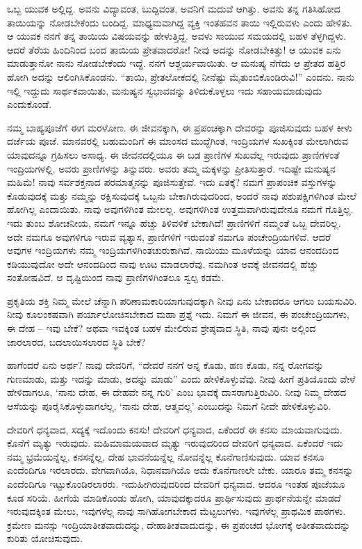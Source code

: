 ಒಬ್ಬ ಯುವಕ ಅಲ್ಲಿದ್ದ. ಅವನು ವಿದ್ಯಾವಂತ, ಬುದ್ದಿವಂತ, ಅವನಿಗೆ ಮದುವೆ ಆಗಿತ್ತು. ಅವನು ತನ್ನ ಗತಿಸಿಹೋದ ತಾಯಿಯನ್ನು ನೋಡಬೇಕೆಂದು ಬಂದಿದ್ದ. ಮಾಧ್ಯಮವಾಗಿದ್ದ ವ್ಯಕ್ತಿ ಇಂತಹವನ ತಾಯಿ ಇಲ್ಲಿರುವಳು ಎಂದು ಹೇಳಿತು. ಆ ಯುವಕ ನನಗೆ ತನ್ನ ತಾಯಿಯ ವಿಷಯವನ್ನು ಹೇಳುತ್ತಿದ್ದ. ಅವಳು ಸಾಯುವ ಸಮಯದಲ್ಲಿ ಬಹಳ ತೆಳ್ಳಗಿದ್ದಳು. ಆದರೆ ತೆರೆಯ ಹಿಂದಿನಿಂದ ಬಂದ ತಾಯಿಯ ಪ್ರೇತವಾದರೋ! ನೀವು ಅದನ್ನು ನೋಡಬೇಕಿತ್ತು! ಆ ಯುವಕ ಏನು ಮಾಡುತ್ತಾನೋ ನಾನು ನೋಡಬೇಕೆಂದು ಇದ್ದೆ. ನನಗೆ ಆಶ್ಚರ್ಯವಾಯಿತು. ಆ ಮನುಷ್ಯ ನೆಗೆದು ಆ ಪ್ರೇತದ ಹತ್ತಿರ ಹೋಗಿ ಅದನ್ನು ಆಲಿಂಗಿಸಿಕೊಂಡನು. “ತಾಯಿ, ಪ್ರೇತಲೋಕದಲ್ಲಿ ನೀನೆಷ್ಟು ಮೈತುಂಬಿಕೊಂಡಿರುವಿ!” ಎಂದನು. ನಾನು ಇಲ್ಲಿ ಇದ್ದುದು ಸಾರ್ಥಕವಾಯಿತು, ಮನುಷ್ಯನ ಸ್ವಭಾವವನ್ನು ತಿಳಿದುಕೊಳ್ಳಲು ಇದು ಸಹಾಯಮಾಡುವುದು ಎಂದುಕೊಂಡೆ.

ನಮ್ಮ ಬಾಹ್ಯಪೂಜೆಗೆ ಈಗ ಮರಳೋಣ. ಈ ಜೀವನಕ್ಕಾಗಿ, ಈ ಪ್ರಪಂಚಕ್ಕಾಗಿ ದೇವರನ್ನು ಪೂಜಿಸುವುದು ಬಹಳ ಕೀಳು ದರ್ಜೆಯ ಪೂಜೆ. ಮಾನವರಲ್ಲಿ ಬಹುಮಂದಿಗೆ ಈ ಮಾಂಸದ ಮುದ್ದೆಗಿಂತ, ಇಂದ್ರಿಯಗಳ ಸುಖಕ್ಕಿಂತ ಮೇಲಾಗಿರುವ ಯಾವುದನ್ನೂ ಗ್ರಹಿಸಲು ಅಸಾಧ್ಯ. ಈ ಜೀವನದಲ್ಲಿಯೂ ಈ ಬಡ ಪ್ರಾಣಿಗಳ ಸುಖವೆಲ್ಲ ಇರುವುದು ಪ್ರಾಣಿಗಳಂತೆ ಇಂದ್ರಿಯಗಳಲ್ಲಿ. ಅವರು ಪ್ರಾಣಿಗಳನ್ನು ತಿನ್ನುವರು. ಅವರು ತಮ್ಮ ಮಕ್ಕಳನ್ನು ಪ್ರೀತಿಸುತ್ತಾರೆ. ಇದಿಷ್ಟೇ ಮನುಷ್ಯನ ಮಹಿಮೆ! ನಾವು ಸರ್ವಶಕ್ತನಾದ ಪರಮಾತ್ಮನನ್ನು ಪೂಜಿಸುತ್ತೇವೆ. ಇದು ಏತಕ್ಕೆ? ನಮಗೆ ಪ್ರಾಪಂಚಿಕ ವಸ್ತುಗಳನ್ನು ಕೊಡುವುದಕ್ಕೆ ಮತ್ತು ನಮ್ಮನ್ನು ರಕ್ಷಿಸುವುದಕ್ಕೆ ಒಬ್ಬನು ಬೇಕಾಗಿರುವುದರಿಂದ, ಅಂದರೆ ನಾವು ಪಶುಪಕ್ಷಿಗಳಿಗಿಂತ ಮೇಲೆ ಹೋಗಿಲ್ಲ ಎಂದಾಯಿತು. ನಾವು ಅವುಗಳಿಗಿಂತ ಮೇಲಲ್ಲ. ಅವುಗಳಿಗಿಂತ ಉತ್ತಮವಾಗಿರುವುದೇನೂ ನಮಗೆ ಗೊತ್ತಿಲ್ಲ. ಇದು ತುಂಬ ಶೋಚನೀಯ, ನಮಗೆ ಇನ್ನೂ ಹೆಚ್ಚು ತಿಳಿವಳಿಕೆ ಬೇಕಾಗಿದೆ! ಪ್ರಾಣಿಗಳಿಗೆ ನಮ್ಮಂತೆ ಒಬ್ಬ ದೇವರಿಲ್ಲ. ಅದೇ ನಮಗೂ ಅವುಗಳಿಗೂ ಇರುವ ವ್ಯತ್ಯಾಸ, ಪ್ರಾಣಿಗಳಿಗೆ ಇರುವಂತೆ ನಮಗೂ ಪಂಚೇಂದ್ರಿಯಗಳಿವೆ. ಆದರೆ ಅವುಗಳ ಇಂದ್ರಿಯಗಳು ನಮ್ಮ ಇಂದ್ರಿಯಗಳಿಗಿಂತ\break ಚುರುಕಾಗಿವೆ. ನಾಯಿಯು ಮೂಳೆಯನ್ನು ಯಾವ ಆನಂದದಿಂದ ಕಡಿಯುವುದೋ ಅದೇ ಆನಂದದಿಂದ ನಾವು ಊಟ ಮಾಡಲಾರೆವು. ನಮಗಿಂತ ಅವಕ್ಕೆ ಜೀವನದಲ್ಲಿ ಹೆಚ್ಚು ಸಂತೋಷವಿದೆ. ಆ ದೃಷ್ಟಿಯಿಂದ ನಾವು ಪ್ರಾಣಿಗಳಿಗಿಂತಲೂ ಸ್ವಲ್ಪ ಕಡಮೆ.

ಪ್ರಕೃತಿಯ ಶಕ್ತಿ ನಿಮ್ಮ ಮೇಲೆ ಚೆನ್ನಾಗಿ ಪರಿಣಾಮಕಾರಿಯಾಗುವುದಕ್ಕಾಗಿ ನೀವು ಏನು ಬೇಕಾದರೂ ಆಗಲು ಬಯಸುವಿರಿ. ನೀವು ಕೂಲಂಕಷವಾಗಿ ಪರ್ಯಾಲೋಚಿಸಬೇಕಾದ ಮಹಾ ಪ್ರಶ್ನೆ ಇದು. ನಿಮಗೆ ಈ ಜೀವನ, ಈ ಪಂಚೇಂದ್ರಿಯಗಳು, ಈ ದೇಹ – ಇವು ಬೇಕೆ? ಅಥವಾ ಇವಕ್ಕಿಂತ ಬಹಳ ಮೇಲಿರುವ ಶ್ರೇಷ್ಠವಾದ ಸ್ಥಿತಿ, ನಾವು ಪುನಃ ಅಲ್ಲಿಂದ ಜಾರಲಾರದ, ಬದಲಾಯಿಸಲಾರದ ಸ್ಥಿತಿ ಬೇಕೆ?

ಹಾಗೆಂದರೆ ಏನು ಅರ್ಥ? ನಾವು ದೇವರಿಗೆ, “ದೇವರೆ ನನಗೆ ಅನ್ನ ಕೊಡು, ಹಣ ಕೊಡು, ನನ್ನ ರೋಗವನ್ನು ಗುಣಮಾಡು, ಮತ್ತು ಇದನ್ನು ಮಾಡು, ಅದನ್ನು ಮಾಡು” ಎಂದು ಹೇಳಿಕೊಳ್ಳುವೆವು. ನೀವು ಹೀಗೆ ಪ್ರತಿಯೊಂದು ವೇಳೆ ಹೇಳಿದಾಗಲೂ, `ನಾನು ದೇಹ, ಈ ದೇಹವೇ ನನ್ನ ಗುರಿ' ಎಂಬ ಭಾವಕ್ಕೆ ದಾಸರಾಗುತ್ತಿರುವಿರಿ. ನೀವು ನಿಮ್ಮ ದೇಹದ ಆಸೆಯನ್ನು ಪೂರೈಸಿಕೊಳ್ಳುವಾಗಲೆಲ್ಲ, `ನಾನು ದೇಹ, ಆತ್ಮವಲ್ಲ' ಎಂಬುದನ್ನು ನಿಮಗೆ ನೀವೇ ಹೇಳಿಕೊಳ್ಳುವಿರಿ.

\newpage

ದೇವರಿಗೆ ಧನ್ಯವಾದ, ಸದ್ಯಕ್ಕೆ ಇದೊಂದು ಕನಸು! ದೇವರಿಗೆ ಧನ್ಯವಾದ, ಏಕೆಂದರೆ ಈ ಕನಸು ಮಾಯವಾಗುವುದು. ಕೊನೆಗೆ ಮೃತ್ಯು ಇರುವುದು. ಮಹಿಮಾಮಯವಾದ ಮೃತ್ಯು ಇರುವುದರಿಂದ ದೇವರಿಗೆ ಧನ್ಯವಾದ. ಏಕೆಂದರೆ ಇದು ನಮ್ಮ ಭ್ರಮೆಯನ್ನೆಲ್ಲ, ಕನಸನ್ನೆಲ್ಲ, ದೇಹ ಭಾವನೆಯನ್ನೆಲ್ಲ ನೋವನ್ನೆಲ್ಲ ಕೊನೆಗಾಣಿಸುವುದು. ಯಾವ ಕನಸೂ ಎಂದೆಂದಿಗೂ ಇರಲಾರದು. ವೇಗವಾಗಿಯೊ, ನಿಧಾನವಾಗಿಯೊ ಅದು ಕೊನೆಗಾಣಲೇ ಬೇಕು. ಯಾರೂ ತಮ್ಮ ಕನಸನ್ನು ಎಂದೆಂದಿಗೂ ಇಟ್ಟುಕೊಂಡಿರಲಾರರು. ಇದು\break ಹೀಗಿರುವುದರಿಂದ ದೇವರಿಗೆ ಧನ್ಯವಾದ. ಆದರೂ ಇಂತಹ ಪೂಜೆಯೂ ಕೂಡ ಸರಿಯೆ. ಹೀಗೆಯೆ ಮಾಡಿಕೊಂಡು ಹೋಗಿ, ಯಾವುದಕ್ಕಾದರೂ ಪ್ರಾರ್ಥಿಸುವುದು ಪ್ರಾರ್ಥನೆಯನ್ನೇ ಮಾಡದೆ ಇರುವುದಕ್ಕಿಂತ ಮೇಲು, ಇವುಗಳೆಲ್ಲ ನಾವು ಸಾಗಿಹೋಗಬೇಕಾದ ಮೆಟ್ಟಲುಗಳು. ಇವುಗಳೆಲ್ಲ ಪ್ರಾಥಮಿಕ ಪಾಠಗಳು. ಕ್ರಮೇಣ ಮನಸ್ಸು ಇಂದ್ರಿಯಾತೀತವಾದುದನ್ನು, ದೇಹಾತೀತವಾದುದನ್ನು, ಈ ಪ್ರಪಂಚದ ಭೋಗಕ್ಕೆ ಅತೀತವಾದುದನ್ನು ಕುರಿತು ಯೋಚಿಸುವುದು.

